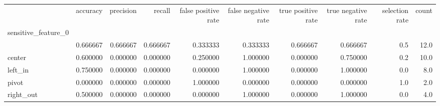 \begin{tabular}{lrrrrrrrrr}
\toprule
{} &  accuracy &  precision &    recall &  false positive rate &  false negative rate &  true positive rate &  true negative rate &  selection rate &  count \\
sensitive\_feature\_0 &           &            &           &                      &                      &                     &                     &                 &        \\
\midrule
                    &  0.666667 &   0.666667 &  0.666667 &             0.333333 &             0.333333 &            0.666667 &            0.666667 &             0.5 &   12.0 \\
center              &  0.600000 &   0.000000 &  0.000000 &             0.250000 &             1.000000 &            0.000000 &            0.750000 &             0.2 &   10.0 \\
left\_in             &  0.750000 &   0.000000 &  0.000000 &             0.000000 &             1.000000 &            0.000000 &            1.000000 &             0.0 &    8.0 \\
pivot               &  0.000000 &   0.000000 &  0.000000 &             1.000000 &             0.000000 &            0.000000 &            0.000000 &             1.0 &    2.0 \\
right\_out           &  0.500000 &   0.000000 &  0.000000 &             0.000000 &             1.000000 &            0.000000 &            1.000000 &             0.0 &    4.0 \\
\bottomrule
\end{tabular}
